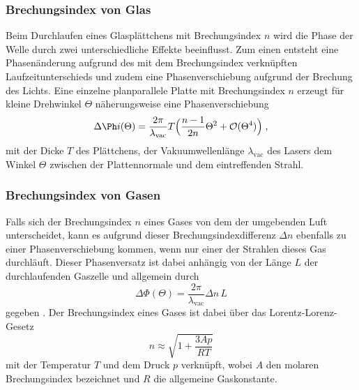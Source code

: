 \subsubsection{Brechungsindex von Glas}
Beim Durchlaufen eines Glasplättchens mit Brechungsindex $n$ wird die Phase der Welle durch zwei
unterschiedliche Effekte beeinflusst. Zum einen entsteht eine Phasenänderung aufgrund
des mit dem Brechungsindex verknüpften Laufzeitunterschieds und zudem eine
Phasenverschiebung aufgrund der Brechung des Lichts. Eine einzelne planparallele Platte
mit Brechungsindex $n$ erzeugt für kleine Drehwinkel $\Theta$  näherungsweise eine Phasenverschiebung \cite{skript}
\begin{equation}
\Delta \Ph
i(\Theta)=\frac{2\pi}{\lambda_{\text{vac}}}T\Bigl(\frac{n-1}{2n}\Theta^2+\mathcal{O}(\Theta^4)   \Bigr) \; ,
\label{eqn:pM0}
\end{equation}
mit der Dicke $T$ des Plättchens, der Vakuumwellenlänge $\lambda_{\text{vac}}$ des Lasers dem Winkel $\Theta$
zwischen der Plattennormale und dem eintreffenden Strahl.

\subsubsection{Brechungsindex von Gasen}
Falls sich der Brechungsindex $n$ eines Gases von dem der umgebenden Luft unterscheidet, kann es
aufgrund dieser Brechungsindexdifferenz $\Delta n$ ebenfalls zu einer Phasenverschiebung
kommen, wenn nur einer der Strahlen dieses Gas durchläuft.
Dieser Phasenversatz ist dabei anhängig von der Länge $L$
der durchlaufenden Gaszelle und allgemein durch
\begin{equation}
\Delta \Phi(\Theta)=\frac{2\pi}{\lambda_{\text{vac}}} \Delta n\,L
\label{eq:pM2}
\end{equation}
gegeben \cite{skript}. Der Brechungsindex eines Gases ist dabei über das Lorentz-Lorenz-Gesetz
\begin{equation}
  n \approx \sqrt{1+ \frac{3Ap}{RT}}
  \label{eqn:lorentz}
\end{equation}
mit der Temperatur $T$ und dem Druck $p$ verknüpft, wobei $A$ den molaren Brechungsindex
bezeichnet und $R$ die allgemeine Gaskonstante.
